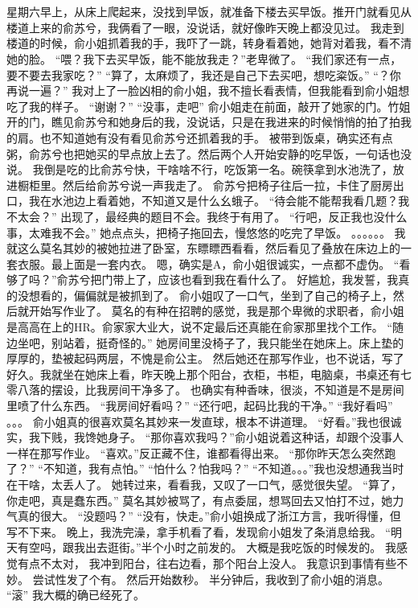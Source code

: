 \chapter{}
星期六早上，从床上爬起来，没找到早饭，就准备下楼去买早饭。推开门就看见从楼道上来的俞苏兮，我俩看了一眼，没说话，就好像昨天晚上都没见过。
我走到楼道的时候，俞小姐抓着我的手，我吓了一跳，转身看着她，她背对着我，看不清她的脸。
“喂？我下去买早饭，能不能放我走？”老卑微了。
“我们家还有一点，要不要去我家吃？”
“算了，太麻烦了，我还是自己下去买吧，想吃粢饭。”
“？你再说一遍？”
我对上了一脸凶相的俞小姐，我不擅长看表情，但我能看到俞小姐想吃了我的样子。
“谢谢？”
“没事，走吧”
俞小姐走在前面，敲开了她家的门。竹姐开的门，瞧见俞苏兮和她身后的我，没说话，只是在我进来的时候悄悄的拍了拍我的肩。也不知道她有没有看见俞苏兮还抓着我的手。
被带到饭桌，确实还有点粥，俞苏兮也把她买的早点放上去了。然后两个人开始安静的吃早饭，一句话也没说。
我倒是吃的比俞苏兮快，干啥啥不行，吃饭第一名。碗筷拿到水池洗了，放进橱柜里。然后给俞苏兮说一声我走了。
俞苏兮把椅子往后一拉，卡住了厨房出口，我在水池边上看着她，不知道又是什么幺蛾子。
“待会能不能帮我看几题？我不太会？”
出现了，最经典的题目不会。我终于有用了。
“行吧，反正我也没什么事，太难我不会。”
她点点头，把椅子拖回去，慢悠悠的吃完了早饭。
。。。。。。
我就这么莫名其妙的被她拉进了卧室，东瞟瞟西看看，然后看见了叠放在床边上的一套衣服。最上面是一套内衣。
嗯，确实是A，俞小姐很诚实，一点都不虚伪。
“看够了吗？”俞苏兮把门带上了，应该也看到我在看什么了。
好尴尬，我发誓，我真的没想看的，偏偏就是被抓到了。
俞小姐叹了一口气，坐到了自己的椅子上，然后就开始写作业了。
莫名的有种在招聘的感觉，我是那个卑微的求职者，俞小姐是高高在上的HR。俞家家大业大，说不定最后还真能在俞家那里找个工作。
“随边坐吧，别站着，挺奇怪的。”
她房间里没椅子了，我只能坐在她床上。床上垫的厚厚的，垫被起码两层，不愧是俞公主。
然后她还在那写作业，也不说话，写了好久。我就坐在她床上看，昨天晚上那个阳台，衣柜，书柜，电脑桌，书桌还有七零八落的摆设，比我房间干净多了。
也确实有种香味，很淡，不知道是不是房间里喷了什么东西。
“我房间好看吗？”
“还行吧，起码比我的干净。”
“我好看吗”
。。。
俞小姐真的很喜欢莫名其妙来一发直球，根本不讲道理。
“好看。”我也很诚实，我下贱，我馋她身子。
“那你喜欢我吗？”俞小姐说着这种话，却跟个没事人一样在那写作业。
“喜欢。”反正藏不住，谁都看得出来。
“那你昨天怎么突然跑了？”
“不知道，我有点怕。”
“怕什么？怕我吗？”
“不知道。。。”我也没想通我当时在干啥，太丢人了。
她转过来，看看我，又叹了一口气，感觉很失望。
“算了，你走吧，真是蠢东西。”
莫名其妙被骂了，有点委屈，想骂回去又怕打不过，她力气真的很大。
“没题吗？”
“没有，快走。”俞小姐换成了浙江方言，我听得懂，但写不下来。
晚上，我洗完澡，拿手机看了看，发现俞小姐发了条消息给我。
“明天有空吗，跟我出去逛街。”半个小时之前发的。
大概是我吃饭的时候发的。
我感觉有点不太对，
我冲到阳台，往右边看，那个阳台上没人。
我意识到事情有些不妙。
尝试性发了个有。
然后开始数秒。
半分钟后，我收到了俞小姐的消息。
“滚”
我大概的确已经死了。

